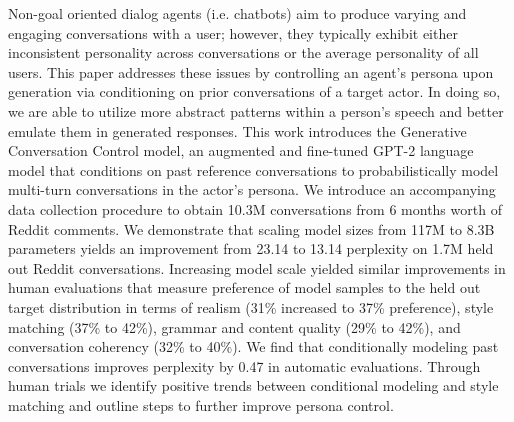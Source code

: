 Non-goal oriented dialog agents (i.e. chatbots) aim to produce varying and engaging conversations with a user; however, they typically exhibit either inconsistent personality across conversations or the average personality of all users. This paper addresses these issues by controlling an agent's persona upon generation via conditioning on prior conversations of a target actor. In doing so, we are able to utilize more abstract patterns within a person's speech and better emulate them in generated responses. This work introduces the Generative Conversation Control model, an augmented and fine-tuned GPT-2 language model that conditions on past reference conversations to probabilistically model multi-turn conversations in the actor's persona. We introduce an accompanying data collection procedure to obtain 10.3M conversations from 6 months worth of Reddit comments. We demonstrate that scaling model sizes from 117M to 8.3B parameters yields an improvement from 23.14 to 13.14 perplexity on 1.7M held out Reddit conversations. Increasing model scale yielded similar improvements in human evaluations that measure preference of model samples to the held out target distribution in terms of realism (31\% increased to 37\% preference), style matching (37\% to 42\%), grammar and content quality (29\% to 42\%), and conversation coherency (32\% to 40\%). We find that conditionally modeling past conversations improves perplexity by 0.47 in automatic evaluations. Through human trials we identify positive trends between conditional modeling and style matching and outline steps to further improve persona control.
